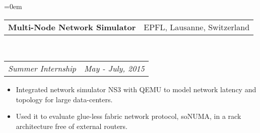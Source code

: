 \documentclass{article}
\makeatletter
\newenvironment{longversion}{}{} %
\newcommand{\headerrow}[2]
{\begin{tabular*}{\linewidth}{l@{\extracolsep{\fill}}r}
	#1 &
	#2 \\
\end{tabular*}}
\makeatother
\begin{document}
\begin{list} {}{\leftmargin=0em}
\item[]
  \headerrow
    {\textbf{Multi-Node Network Simulator}}
    {EPFL, Lausanne, Switzerland}
  \\
  \headerrow
    {\emph{Summer Internship}}
    {\emph{May - July, 2015}}
      \begin{itemize}
        \item Integrated network simulator NS3 with QEMU to model network latency and topology for large  data-centers.
        \item Used it to evaluate glue-less fabric network protocol, soNUMA, in a rack architecture free of external routers.
      \end{itemize}

\end{list}

\begin{longversion}
\end{longversion}
\end{document}
